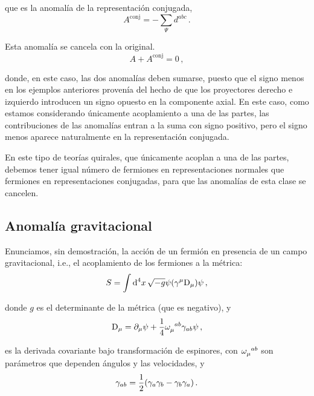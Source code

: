 \noindent que es la anomalía de la representación conjugada,
%
\begin{equation}
	A^{\text{conj}} = - \sum_\varPsi d^{abc} \,.
\end{equation}

Esta anomalía se cancela con la original.
%
\begin{equation}
	A + A^{\text{conj}} = 0 \,,
\end{equation}

\noindent donde, en este caso, las dos anomalías deben sumarse, puesto que el signo menos en los ejemplos anteriores provenía del hecho de que los proyectores derecho e izquierdo introducen un signo opuesto en la componente axial. En este caso, como estamos considerando únicamente acoplamiento a una de las partes, las contribuciones de las anomalías entran a la suma con signo positivo, pero el signo menos aparece naturalmente en la representación conjugada.

En este tipo de teorías quirales, que únicamente acoplan a una de las partes, debemos tener igual número de fermiones en representaciones normales que fermiones en representaciones conjugadas, para que las anomalías de esta clase se cancelen.




\subsection{Anomalía gravitacional}

Enunciamos, sin demostración, la acción de un fermión en presencia de un campo gravitacional, i.e., el acoplamiento de los fermiones a la métrica:
%
\begin{equation}
	S = \int \dd[4]{x} \sqrt{-g} \psi \qty(\gamma^\mu \mathrm{D}_\mu)\psi \,,
\end{equation}

\noindent donde $g$ es el determinante de la métrica (que es negativo), y
%
\begin{equation}
	\codv_\mu = \partial_\mu \psi + \frac{1}{4} \omega\indices{_\mu^{ab}} \gamma_{ab} \psi \,,
\end{equation}

\noindent es la derivada covariante bajo transformación de espinores, con $\omega\indices{_\mu^{ab}}$ son parámetros que dependen ángulos y las velocidades, y
%
\begin{equation}
	\gamma_{ab} = \frac{1}{2} \qty(\gamma_a \gamma_b- \gamma_b \gamma_a) \,.
\end{equation}

